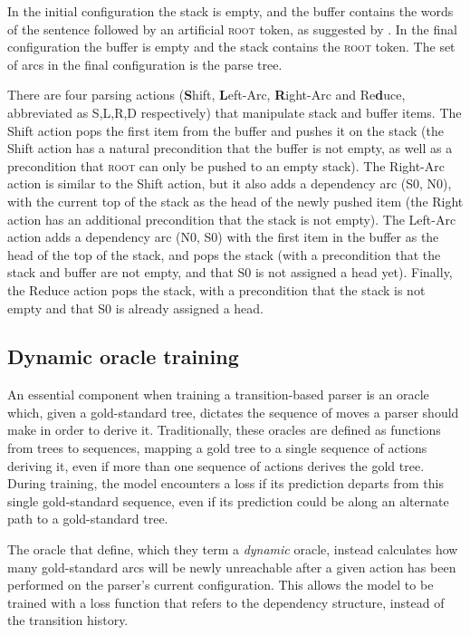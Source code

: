 \documentclass[11pt,letterpaper]{article}
\begin{document}
In the initial configuration the stack is empty, and the buffer contains the words
of the sentence followed by an artificial \textsc{root} token, as suggested by
\citet{nivre:squib}.
In the final configuration the buffer is empty and the stack contains the 
\textsc{root} token. The set of arcs in the final configuration is the parse tree.

There are four parsing actions (\textbf{S}hift, \textbf{L}eft-Arc,
\textbf{R}ight-Arc and Re\textbf{d}uce, abbreviated as S,L,R,D respectively)
that manipulate stack and buffer items. The Shift action pops the first item
from the buffer and pushes it on the stack (the Shift action has a natural
precondition that the buffer is not empty, as well as a precondition that
\textsc{root} can only be pushed to an empty stack). The Right-Arc action is
similar to the Shift action, but it also adds a dependency arc (S0, N0),
with the current top of the stack as the head of the newly pushed item (the Right
action has an additional precondition that the stack is not empty). The Left-Arc
action adds a dependency arc (N0, S0) with the first item in the buffer as the
head of the top of the stack, and pops the stack (with a precondition that the
stack and buffer are not empty, and that S0 is not assigned a head yet). Finally,
the Reduce action pops the stack, with a precondition that the stack is not empty
and that S0 is already assigned a head.

\subsection{Dynamic oracle training}

An essential component when training a transition-based parser is an oracle which,
given a gold-standard tree, dictates the sequence of moves a parser should make
in order to derive it. Traditionally, these oracles are defined as functions from
trees to sequences, mapping a gold tree to a single sequence of actions deriving it,
even if more than one sequence of actions derives the gold tree. During training,
the model encounters a loss if its prediction departs from this single gold-standard
sequence, even if its prediction could be along an alternate path to a gold-standard tree.

The oracle that \citep{goldberg:12} define, which they term a \emph{dynamic} oracle,
instead calculates how many gold-standard arcs will be newly unreachable after a
given action has been performed on the parser’s current configuration. This allows
the model to be trained with a loss function that refers to the dependency structure,
instead of the transition history.
\end{document}
